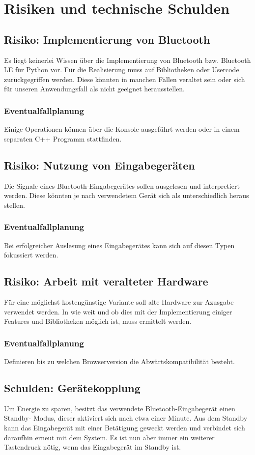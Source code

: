 \chapter{Risiken und technische Schulden}

\section{Risiko: Implementierung von Bluetooth}
Es liegt keinerlei Wissen über die Implementierung von Bluetooth bzw. Bluetooth LE für Python vor. Für die Realisierung muss auf Bibliotheken oder Usercode zurückgegriffen werden. Diese könnten in manchen Fällen veraltet sein oder sich für unseren Anwendungsfall als nicht geeignet herausstellen.
\subsection*{Eventualfallplanung}
Einige Operationen können über die Konsole ausgeführt werden oder in einem separaten C++ Programm stattfinden.

\section{Risiko: Nutzung von Eingabegeräten}
Die Signale eines Bluetooth-Eingabegerätes sollen ausgelesen und interpretiert werden. Diese könnten je nach verwendetem Gerät sich als unterschiedlich heraus stellen.
\subsection*{Eventualfallplanung}
Bei erfolgreicher Auslesung eines Eingabegerätes kann sich auf diesen Typen fokussiert werden.

\section{Risiko: Arbeit mit veralteter Hardware}
Für eine möglichst kostengünstige Variante soll alte Hardware zur Azusgabe verwendet werden. In wie weit und ob dies mit der Implementierung einiger Features und Bibliotheken möglich ist, muss ermittelt werden.
\subsection*{Eventualfallplanung}
Definieren bis zu welchen Browserversion die Abwärtskompatibilität besteht.

\section{Schulden: Gerätekopplung}
Um Energie zu sparen, besitzt das verwendete Bluetooth-Eingabegerät einen Standby- Modus, dieser aktiviert sich nach etwa einer Minute. Aus dem Standby kann das Eingabegerät mit einer Betätigung geweckt werden und verbindet sich daraufhin erneut mit dem System. Es ist nun aber immer ein weiterer Tastendruck nötig, wenn das Eingabegerät im Standby ist.